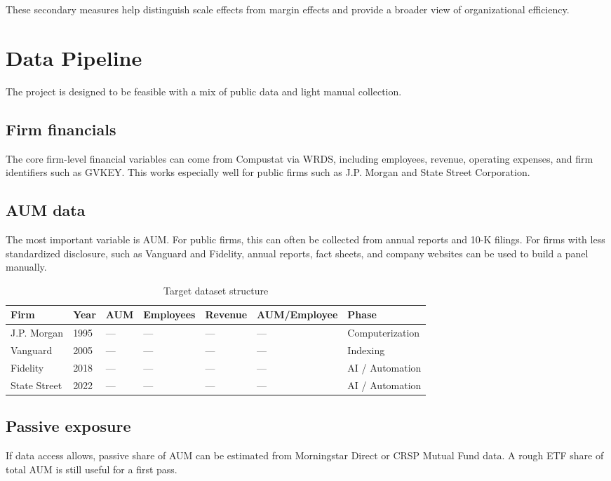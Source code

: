 \documentclass{article}
\begin{document}
These secondary measures help distinguish scale effects from margin effects and provide a broader view of organizational efficiency.

\section{Data Pipeline}
The project is designed to be feasible with a mix of public data and light manual collection.

\subsection{Firm financials}
The core firm-level financial variables can come from Compustat via WRDS, including employees, revenue, operating expenses, and firm identifiers such as GVKEY. This works especially well for public firms such as J.P. Morgan and State Street Corporation.

\subsection{AUM data}
The most important variable is AUM. For public firms, this can often be collected from annual reports and 10-K filings. For firms with less standardized disclosure, such as Vanguard and Fidelity, annual reports, fact sheets, and company websites can be used to build a panel manually.

\begin{table}[h]
  \centering
  \caption{Target dataset structure}
  \begin{tabular}{lllllll}
    \toprule
    Firm & Year & AUM & Employees & Revenue & AUM/Employee & Phase \\
    \midrule
    J.P. Morgan & 1995 & --- & --- & --- & --- & Computerization \\
    Vanguard & 2005 & --- & --- & --- & --- & Indexing \\
    Fidelity & 2018 & --- & --- & --- & --- & AI / Automation \\
    State Street & 2022 & --- & --- & --- & --- & AI / Automation \\
    \bottomrule
  \end{tabular}
\end{table}

\subsection{Passive exposure}
If data access allows, passive share of AUM can be estimated from Morningstar Direct or CRSP Mutual Fund data. A rough ETF share of total AUM is still useful for a first pass.
\end{document}
